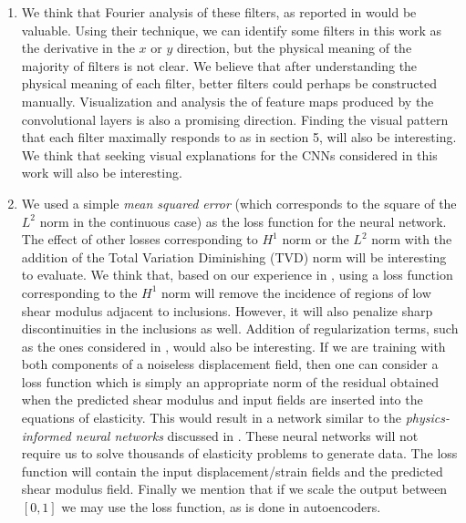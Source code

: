 \documentclass[12pt]{article}
\begin{document}
\begin{enumerate}
\item{We think that Fourier analysis of these filters, as reported in \cite{paper:pateloberai2019} would be valuable. Using their technique, we can identify some filters in this work as the derivative in the $x$ or $y$ direction, but the physical meaning of the majority of filters is not clear. We believe that after understanding the physical meaning of each filter, better filters could perhaps be constructed manually. Visualization and analysis the of feature maps produced by the convolutional layers is also a promising direction. Finding the visual pattern that each filter maximally responds to as in \cite{book:chollet} section 5, will also be interesting. We think that seeking visual explanations \cite{paper:selvaraju_2019} for the CNNs considered in this work will also be interesting.}
\item{We used a simple \textit{mean squared error} (which corresponds to the square of the $L^2$ norm in the continuous case) as the loss function for the neural network. The effect of other losses corresponding to $H^1$ norm or the $L^2$ norm with the addition of the Total Variation Diminishing (TVD) norm will be interesting to evaluate. We think that, based on our experience in \cite{diss:gokhale2007}, using a loss function corresponding to the $H^1$ norm will remove the incidence of regions of low shear modulus adjacent to inclusions. However, it will also penalize sharp discontinuities in the inclusions as well. Addition of regularization terms, such as the ones considered in \cite{diss:gokhale2007}, would also be interesting. If we are training with both components of a noiseless displacement field, then one can consider a loss function which is simply an appropriate norm of the  residual obtained when the predicted shear modulus and input fields are inserted into the equations of elasticity. This would result in a network similar to the \textit{physics-informed neural networks} discussed in \cite{paper:pinnkarniadakis}. These neural networks will not require us to solve thousands of elasticity problems to generate data. The loss function will contain the input displacement/strain fields and the predicted shear modulus field. Finally we mention that if we scale the output between $[0,1]$ we may use the  loss function, as is done in autoencoders.}

\end{enumerate}
\end{document}
